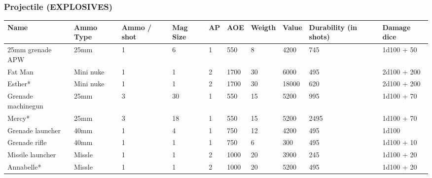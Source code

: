 
\subsubsection{Projectile (EXPLOSIVES)}
\begin{longtable}{|p{2.6cm}|p{2cm}|p{1.3cm}|p{.9cm}|p{0.6cm}|p{0.9cm}|p{1.3cm}|p{1.2cm}|p{2cm}|p{2.6cm}|}
\hline
\bfseries Name & \bfseries Ammo Type & \bfseries Ammo / shot & \bfseries Mag Size & \bfseries AP & \bfseries AOE & \bfseries Weigth & \bfseries Value & \bfseries Durability (in shots) & \bfseries Damage dice \\
\hline
\endhead
25mm grenade APW & 25mm & 1 & 6 & 1 & 550 & 8 & 4200 & 745 & 1d100 + 50 \\
Fat Man & Mini nuke & 1 & 1 & 2 & 1700 & 30 & 6000 & 495 & 2d100 + 200 \\
Esther* & Mini nuke & 1 & 1 & 2 & 1700 & 30 & 18000 & 620 & 2d100 + 200 \\
Grenade machinegun & 25mm & 3 & 30 & 1 & 550 & 15 & 5200 & 995 & 1d100 + 70 \\
Mercy* & 25mm & 3 & 18 & 1 & 550 & 15 & 5200 & 2495 & 1d100 + 70 \\
Grenade launcher & 40mm & 1 & 4 & 1 & 750 & 12 & 4200 & 495 & 1d100 \\
Grenade rifle & 40mm & 1 & 1 & 1 & 750 & 6 & 300 & 495 & 1d100 + 10 \\
Missile launcher & Missle & 1 & 1 & 2 & 1000 & 20 & 3900 & 245 & 1d100 + 20 \\
Annabelle* & Missle & 1 & 1 & 2 & 1000 & 20 & 5200 & 495 & 1d100 + 20 \\
\hline
\end{longtable}
